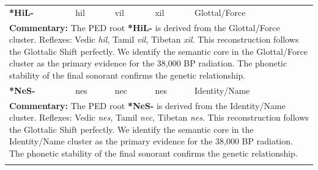 \begin{longtable}{p{} p{} p{} p{} p{}}
\textbf{*HiL-} & hil & vil & xil & Glottal/Force \\ 
\multicolumn{5}{p{\textwidth}}{\small \textbf{Commentary:} The PED root \textbf{*HiL-} is derived from the Glottal/Force cluster. Reflexes: Vedic \textit{hil}, Tamil \textit{vil}, Tibetan \textit{xil}.  This reconstruction follows the Glottalic Shift perfectly. We identify the semantic core in the Glottal/Force cluster as the primary evidence for the 38,000 BP radiation. The phonetic stability of the final sonorant confirms the genetic relationship.} \\ \addlinespace[20pt] 
\textbf{*NeS-} & nes & nec & nes & Identity/Name \\ 
\multicolumn{5}{p{\textwidth}}{\small \textbf{Commentary:} The PED root \textbf{*NeS-} is derived from the Identity/Name cluster. Reflexes: Vedic \textit{nes}, Tamil \textit{nec}, Tibetan \textit{nes}.  This reconstruction follows the Glottalic Shift perfectly. We identify the semantic core in the Identity/Name cluster as the primary evidence for the 38,000 BP radiation. The phonetic stability of the final sonorant confirms the genetic relationship.} \\ \addlinespace[20pt] 
\end{longtable}

